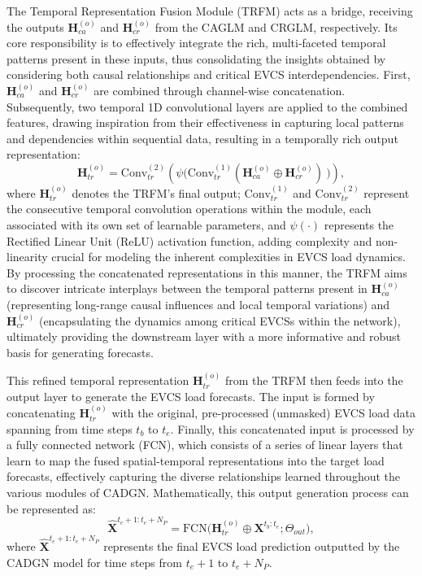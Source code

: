\documentclass[lettersize,journal]{IEEEtran}
\begin{document}
The Temporal Representation Fusion Module (TRFM) acts as a bridge, receiving the outputs $\bm{H}^{(o)}_{ca}$ and  $\bm{H}^{(o)}_{cr}$ from the CAGLM and CRGLM, respectively. Its core responsibility is to effectively integrate the rich, multi-faceted temporal patterns present in these inputs, thus consolidating the insights obtained by considering both causal relationships and critical EVCS interdependencies. 
First, $\bm{H}^{(o)}_{ca}$  and $\bm{H}^{(o)}_{cr}$ are combined through channel-wise concatenation. Subsequently, two temporal 1D convolutional layers are applied to the combined features, drawing inspiration from their effectiveness in capturing local patterns and dependencies within sequential data, resulting in a temporally rich output representation:
\begin{equation}
	\bm{H}^{(o)}_{tr} = \text{Conv}^{(2)}_{tr}\left(\psi \big( \text{Conv}^{(1)}_{tr}(\bm{H}^{(o)}_{ca} \oplus \bm{H}^{(o)}_{cr}) ~ \big) \right),
	\label{eq:trfm_output}
\end{equation}
where $\bm{H}^{(o)}_{tr}$ denotes the TRFM’s final output; $\text{Conv}^{(1)}_{tr}$ and $\text{Conv}^{(2)}_{tr}$   represent the consecutive temporal convolution operations within the module, each associated with its own set of learnable parameters, and $\psi(\cdot)$ represents the Rectified Linear Unit (ReLU) activation function, adding complexity and non-linearity crucial for modeling the inherent complexities in EVCS load dynamics. By processing the concatenated representations in this manner, the TRFM aims to discover intricate interplays between the temporal patterns present in  $\bm{H}^{(o)}_{ca}$  (representing long-range causal influences and local temporal variations)  and $\bm{H}^{(o)}_{cr}$ (encapsulating the dynamics among critical EVCSs within the network), ultimately providing the downstream layer with a more informative and robust basis for generating forecasts.

This refined temporal representation $\bm{H}^{(o)}_{tr}$ from the TRFM then feeds into the output layer to generate the EVCS load forecasts. The input is formed by concatenating  $\bm{H}^{(o)}_{tr}$  with the original, pre-processed (unmasked) EVCS load data spanning from time steps $t_{b}$ to $t_{e}$. Finally, this concatenated input is processed by a fully connected network (FCN), which consists of a series of linear layers that learn to map the fused spatial-temporal representations into the target load forecasts, effectively capturing the diverse relationships learned throughout the various modules of CADGN.
Mathematically, this output generation process can be represented as: 
\begin{equation}
	\hat{\bm{X}}^{t_{e}+1: t_{e}+N_P} =  \text{FCN}\big(\bm{H}^{(o)}_{tr}  \oplus \bm{X}^{t_{b}: t_{e}}; \Theta_{out} \big),
	\label{eq:final_output}
\end{equation}  
where $\hat{\bm{X}}^{t_{e}+1:t_{e}+N_P}$ represents the final EVCS load prediction outputted by the CADGN model for time steps from  $t_{e} + 1$  to $t_{e} + N_P$.
\end{document}
